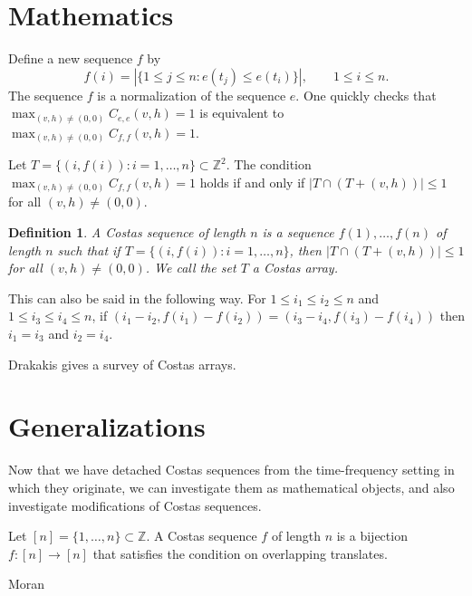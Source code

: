 \documentclass[10pt]{article}
\newtheorem*{definition}{Definition}
\begin{document}
\section{Mathematics}
Define a new sequence $f$ by
\[
f(i)=|\{1 \leq j \leq n:e(t_j) \leq e(t_i)\}|, \qquad
1 \leq i \leq n.
\]
The sequence $f$ is a normalization of the sequence $e$. One quickly checks
that
$\max_{(v,h) \neq (0,0)} C_{e,e}(v,h)=1$ is equivalent to 
$\max_{(v,h) \neq (0,0)} C_{f,f}(v,h)=1$.

Let $T=\{(i,f(i)):i=1,\ldots,n\} \subset \mathbb{Z}^2$.
The condition $\max_{(v,h) \neq (0,0)} C_{f,f}(v,h)=1$
holds if and only if $|T \cap (T+(v,h))| \leq 1$ for
all $(v,h) \neq (0,0)$.

\begin{definition}
A {\em Costas sequence of length $n$} is a sequence $f(1),\ldots,f(n)$
of length $n$ such that if $T=\{(i,f(i)):i=1,\ldots,n\}$, then
$|T \cap (T+(v,h))| \leq 1$ for all $(v,h) \neq (0,0)$. We call the set
$T$ a {\em Costas array}.
\end{definition}

This can also be said in the following way.
For $1 \leq i_1 \leq i_2 \leq n$
and $1 \leq i_3 \leq i_4 \leq n$,
if $(i_1-i_2,f(i_1)-f(i_2))=
(i_3-i_4,f(i_3)-f(i_4))$ then $i_1=i_3$ and $i_2=i_4$.

Drakakis \cite{review} 
gives a survey of Costas arrays.

\section{Generalizations}
Now that we have detached Costas sequences from the time-frequency setting
in which they originate, 
we can investigate them as mathematical objects, and also investigate
modifications of Costas sequences.

Let $[n]=\{1,\ldots,n\} \subset \mathbb{Z}$.
A Costas sequence $f$ of length $n$ is a bijection $f:[n] \to [n]$ that satisfies
the condition on overlapping translates.

Moran \cite{moran}




\end{document}
